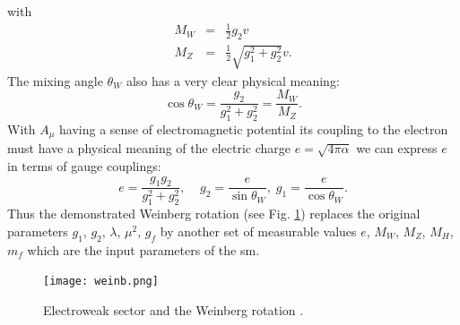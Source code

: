 with
\begin{equation}
\begin{array}{lll} 
M_W &= & \frac{1}{2} g_2 v\\ 
M_Z &=& \frac{1}{2} \sqrt{g_1^2+g_2^2} v.
\end{array} 
\end{equation}
The mixing angle $\theta_W$ also has a very clear physical meaning:
\begin{equation}
\cos{\theta_W}=\frac{g_2}{g_1^2+g_2^2}=\frac{M_W}{M_Z}.
\end{equation}
With $A_{\mu}$ having a sense of electromagnetic potential its coupling to the electron must have a physical meaning of the electric charge $e=\sqrt{4\pi\alpha}$ we can express $e$ in terms of gauge couplings:
\begin{equation}
e=\frac{g_1 g_2}{g_1^2+g_2^2}, \;\;\;\;g_2=\frac{e}{\sin{\theta_W}},\;g_1=\frac{e}{\cos{\theta_W}} .
\end{equation}
Thus the demonstrated Weinberg rotation (see Fig. \ref{fig::weiberg_rotation}) replaces the original parameters $g_1$, $g_2$, $\lambda$, $\mu^2$, $g_f$ by another set of measurable values $e$, $M_W$, $M_Z$, $M_H$, $m_f$ which are the input parameters of the \gls{sm}.


\begin{figure}[htpb]
	\centering
	\texttt{[image: weinb.png]}
	\caption{Electroweak sector and the Weinberg rotation \cite{coupl_wiki}. }
	\label{fig::weiberg_rotation}
\end{figure}

